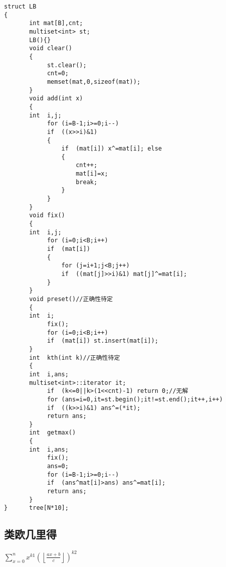 \documentclass{article}
\begin{document}
\begin{CJK*}{UTF8}{song}
\begin{lstlisting}
struct LB
{
       int mat[B],cnt;
       multiset<int> st;
       LB(){}
       void clear()
       {
            st.clear();
            cnt=0;
            memset(mat,0,sizeof(mat));
       }
       void add(int x)
       {
       int  i,j;
            for (i=B-1;i>=0;i--)
            if  ((x>>i)&1)
            {
                if  (mat[i]) x^=mat[i]; else
                {
                    cnt++;
                    mat[i]=x;
                    break;
                }
            }
       }
       void fix()
       {
       int  i,j;
            for (i=0;i<B;i++)
            if  (mat[i])
            {
                for (j=i+1;j<B;j++)
                if  ((mat[j]>>i)&1) mat[j]^=mat[i];
            }
       }
       void preset()//正确性待定
       {
       int  i;
            fix();
            for (i=0;i<B;i++)
            if  (mat[i]) st.insert(mat[i]);
       }
       int  kth(int k)//正确性待定
       {
       int  i,ans;
       multiset<int>::iterator it;
            if  (k<=0||k>(1<<cnt)-1) return 0;//无解
            for (ans=i=0,it=st.begin();it!=st.end();it++,i++)
            if  ((k>>i)&1) ans^=(*it);
            return ans;
       }
       int  getmax()
       {
       int  i,ans;
            fix();
            ans=0;
            for (i=B-1;i>=0;i--)
            if  (ans^mat[i]>ans) ans^=mat[i];
            return ans;
       }
}      tree[N*10];

\end{lstlisting}
\subsection{类欧几里得}


$
\sum_{x=0}^{n} x^{k1} (\left \lfloor \frac{ax+b}{c} \right \rfloor)^{k2}
$



\end{CJK*}
\end{document}
